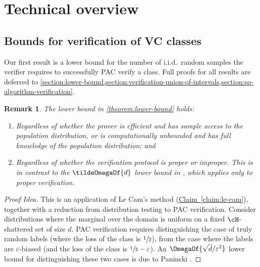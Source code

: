 \documentclass[11pt]{article}
\newcommand{\expref}[2]{\texorpdfstring{\hyperref[#2]{#1~\ref{#2}}}{#1~\ref{#2}}}
\newtheorem{theorem}{Theorem}[section]
\newtheorem{remark}[theorem]{Remark}
\begin{document}
\section{Technical overview}\label{section:technical-overview}

\subsection{Bounds for verification of VC classes}

Our first result is a lower bound for the number of i.i.d.\ random samples the verifier requires to successfully PAC verify a class. Full proofs for all results are deferred to \cref{section:lower-bound,section:verification-union-of-intervals,section:sq-algorithm-verification}.


\begin{remark}
	The lower bound in \cref{theorem:lower-bound} holds:
	\begin{enumerate}
		\item{
			Regardless of whether the prover is efficient and has sample access to the population distribution, or is computationally unbounded and has full knowledge of the population distribution; and
		}
		\item{
			Regardless of whether the verification protocol is proper or improper. This is in contrast to the $\tildeOmegaOf{d}$ lower bound in %
			\cite[Lemma 4.1]{GoldwasserRSY21}, %
			which applies only to proper verification.
		}
	\end{enumerate}
\end{remark}

\begin{proof}[Proof Idea]
	This is an application of Le Cam's method (\expref{Claim}{claim:le-cam}), together with a reduction from distribution testing to PAC verification.  
	Consider distributions where the marginal over the domain is uniform on a fixed $\cH$-shattered set of size $d$.
	PAC verification requires distinguishing the case of truly random labels (where the loss of the class is $\sfrac{1}{2}$), from the case where the labels are $\varepsilon$-biased (and the loss of the class is $\sfrac{1}{2}-\varepsilon$). An $\OmegaOf{\sqrt{d}/\varepsilon^2}$ lower bound for distinguishing these two cases is due to Paninski \cite{DBLP:journals/tit/Paninski08}.
\end{proof}
\end{document}
